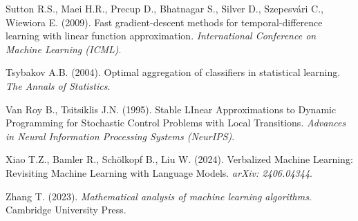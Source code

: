 %
{Sutton R.S., Maei H.R., Precup D., Bhatnagar S., Silver D., Szepesv{\'a}ri C., Wiewiora E. (2009). Fast gradient-descent methods for temporal-difference learning with linear function approximation. \textit{International Conference on Machine Learning (ICML)}.}

%
{Tsybakov A.B. (2004). Optimal aggregation of classifiers in statistical learning. \textit{The Annals of Statistics}.}

%
{Van Roy B., Tsitsiklis J.N. (1995). Stable LInear Approximations to Dynamic Programming for Stochastic Control Problems with Local Transitions. \textit{Advances in Neural Information Processing Systems (NeurIPS)}.}

%
{Xiao T.Z., Bamler R., Schölkopf B., Liu W. (2024). Verbalized Machine Learning: Revisiting Machine Learning with Language Models. \textit{arXiv: 2406.04344}.}

%
{Zhang T. (2023). \textit{Mathematical analysis of machine learning algorithms}. Cambridge University Press.}

